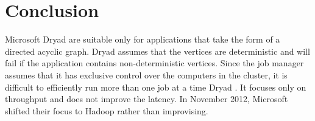 \documentclass[9pt,twocolumn,twoside]{../../styles/osajnl}
\begin{document}
\section{Conclusion}
Microsoft Dryad are suitable only for applications that take the form
of a directed acyclic graph. Dryad assumes that the vertices are
deterministic and will fail if the application contains
non-deterministic vertices. Since the job manager assumes that it has
exclusive control over the computers in the cluster, it is difficult
to efficiently run more than one job at a time Dryad
\cite{DryadMSR4}. It focuses only on throughput and does not improve
the latency. In November 2012, Microsoft shifted their focus to Hadoop
rather than improvising.

\end{document}
